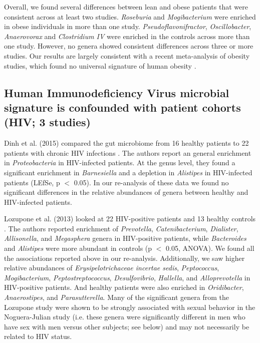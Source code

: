 {Overall, we found several differences between lean and obese patients that were consistent across at least two studies.
\textit{Roseburia} and \textit{Mogibacterium} were enriched in obese individuals in more than one study. \textit{Pseudoflavonifractor}, \textit{Oscillobacter}, \textit{Anaerovorax} and \textit{Clostridium IV} were enriched in the controls across more than one study. However, no genera showed consistent differences across three or more studies.
Our results are largely consistent with a recent meta-analysis of obesity studies, which found no universal signature of human obesity \cite{Sze07092016}.

\subsection*{Human Immunodeficiency Virus microbial signature is confounded with patient cohorts (HIV; 3 studies)}

Dinh et al. (2015) compared the gut microbiome from 16 healthy patients to 22 patients with chronic HIV infections \cite{hiv-dinh}.
The authors report an general enrichment in \textit{Proteobacteria} in HIV-infected patients.
At the genus level, they found a significant enrichment in \textit{Barnesiella} and a depletion in \textit{Alistipes} in HIV-infected patients (LEfSe, p $<$ 0.05).
In our re-analysis of these data we found no significant differences in the relative abundances of genera between healthy and HIV-infected patients.

Lozupone et al. (2013) looked at 22 HIV-positive patients and 13 healthy controls \cite{lozupone2013alterations}.
The authors reported enrichment of \textit{Prevotella}, \textit{Catenibacterium}, \textit{Dialister}, \textit{Allisonella}, and \textit{Megasphera} genera in HIV-positive patients, while \textit{Bacteroides} and \textit{Alistipes} were more abundant in controls (p $<$ 0.05, ANOVA).
We found all the associations reported above in our re-analysis.
Additionally, we saw higher relative abundances of \textit{Erysipelotrichaceae incertae sedis}, \textit{Peptococcus}, \textit{Mogibacterium}, \textit{Peptostreptococcus}, \textit{Desulfovibrio}, \textit{Hallella}, and \textit{Alloprevotella} in HIV-positive patients.
And healthy patients were also enriched in \textit{Oridibacter}, \textit{Anaerostipes}, and \textit{Parasutterella}.
Many of the significant genera from the Lozupone study were shown to be strongly associated with sexual behavior in the Noguera-Julian study (i.e. these genera were significantly different in men who have sex with men versus other subjects; see below) and may not necessarily be related to HIV status.

}
